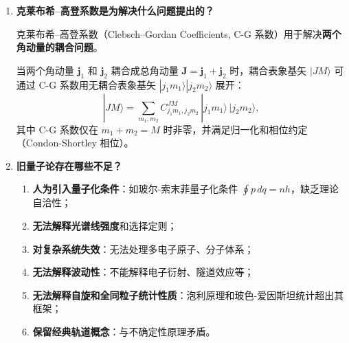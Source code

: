 \begin{enumerate}[label=\textbf{\arabic*.}, leftmargin=2em, itemsep=0.8em]
自旋量子数 $s=3/2$ 时，$s_z$ 的本征值 $m_s$ 可取 $-3/2, -1/2, +1/2, +3/2$，共 $2s+1 = 4$ 个值。因此自旋本征函数为 \textbf{4 行 1 列}的旋量矩阵：
\[
    \chi_{m_s} = \begin{pmatrix} \chi_{+3/2} \\ \chi_{+1/2} \\ \chi_{-1/2} \\ \chi_{-3/2} \end{pmatrix},
    \quad
    \hat{S}_z = \frac{\hbar}{2}\begin{pmatrix} 3 & 0 & 0 & 0 \\ 0 & 1 & 0 & 0 \\ 0 & 0 & -1 & 0 \\ 0 & 0 & 0 & -3 \end{pmatrix}.
\]

\item \textbf{克莱布希--高登系数是为解决什么问题提出的？}

克莱布希--高登系数（Clebsch--Gordan Coefficients, C-G 系数）用于解决\textbf{两个角动量的耦合问题}。

当两个角动量 $\mathbf{j}_1$ 和 $\mathbf{j}_2$ 耦合成总角动量 $\mathbf{J} = \mathbf{j}_1 + \mathbf{j}_2$ 时，耦合表象基矢 $|JM\rangle$ 可通过 C-G 系数用无耦合表象基矢 $|j_1m_1\rangle|j_2m_2\rangle$ 展开：
\[
    |JM\rangle = \sum_{m_1,m_2} C_{j_1m_1,j_2m_2}^{JM}\, |j_1m_1\rangle\,|j_2m_2\rangle,
\]
其中 C-G 系数仅在 $m_1+m_2=M$ 时非零，并满足归一化和相位约定（Condon-Shortley 相位）。

\item \textbf{旧量子论存在哪些不足？}

\begin{enumerate}[nosep, label=(\arabic*)]
    \item \textbf{人为引入量子化条件}：如玻尔-索末菲量子化条件 $\oint p\,dq = nh$，缺乏理论自洽性；
    \item \textbf{无法解释光谱线强度}和选择定则；
    \item \textbf{对复杂系统失效}：无法处理多电子原子、分子体系；
    \item \textbf{无法解释波动性}：不能解释电子衍射、隧道效应等；
    \item \textbf{无法解释自旋和全同粒子统计性质}：泡利原理和玻色-爱因斯坦统计超出其框架；
    \item \textbf{保留经典轨道概念}：与不确定性原理矛盾。
\end{enumerate}


\end{enumerate}
